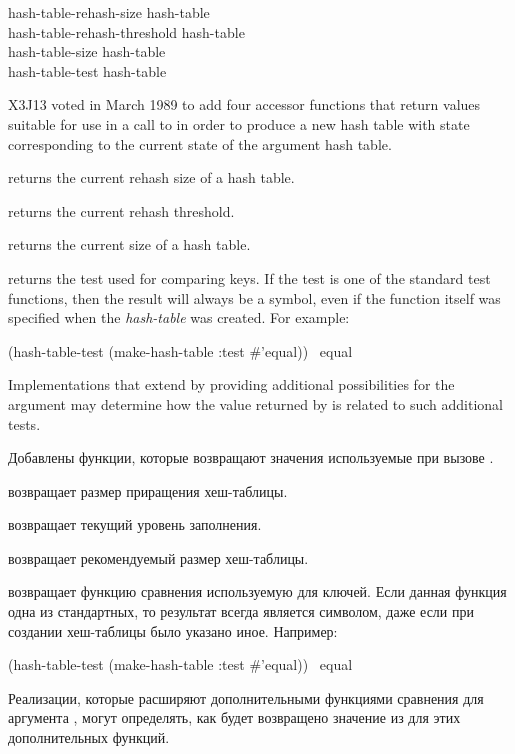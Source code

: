 \begin{newer}
\begin{defun}[Function]
hash-table-rehash-size hash-table \\
hash-table-rehash-threshold hash-table \\
hash-table-size hash-table \\
hash-table-test hash-table

X3J13 voted in March 1989 
to add four accessor functions that return values suitable for use in a call to
 in order to produce a new hash table with state
corresponding to the current state of the argument hash table.
 
 returns the current rehash size of a hash table.

 returns the current rehash threshold.

 returns the current size of a hash table.

 returns the test used for comparing keys.
If the test is one of the standard test functions, then the result
will always be a symbol, even if the function itself was specified
when the \emph{hash-table} was created.  For example:
\begin{lisp}
(hash-table-test (make-hash-table :test \#'equal)) \EV\ equal
\end{lisp}
Implementations that extend  by providing additional
possibilities for the  argument may determine how the
value returned by  is related to such additional tests.

Добавлены функции, которые возвращают значения используемые при вызове
.

 возвращает размер приращения хеш-таблицы.

 возвращает текущий уровень заполнения.

 возвращает рекомендуемый размер хеш-таблицы.

 возвращает функцию сравнения используемую для ключей.
Если данная функция одна из стандартных, то результат всегда является символом,
даже если при создании хеш-таблицы было указано иное. Например:
\begin{lisp}
(hash-table-test (make-hash-table :test \#'equal)) \EV\ equal
\end{lisp}
Реализации, которые расширяют  дополнительными функциями
сравнения для аргумента , могут определять, как будет возвращено
значение из  для этих дополнительных функций.
\end{defun} 
\end{newer}

